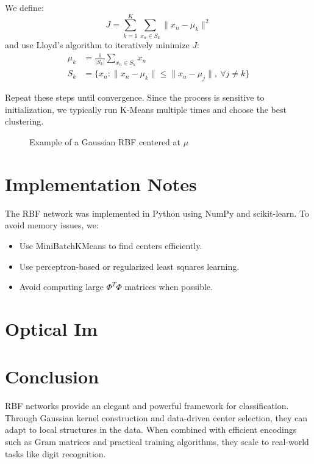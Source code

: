 \documentclass[twocolumn]{article} %
\begin{document}
We define:
\[
J = \sum_{k=1}^K \sum_{x_n \in S_k} \| x_n - \mu_k \|^2
\]
and use Lloyd's algorithm to iteratively minimize $J$:
\begin{align*}
\mu_k &= \frac{1}{|S_k|}\sum_{x_n \in S_k} x_n \\
S_k &= \{ x_n : \|x_n - \mu_k\| \leq \|x_n - \mu_j\|,\ \forall j \neq k \}
\end{align*}

Repeat these steps until convergence. Since the process is sensitive to initialization, we typically run K-Means multiple times and choose the best clustering.

\begin{figure}[h!]
    \centering
    
    \caption{Example of a Gaussian RBF centered at $\mu$}
    \label{fig:gaussian_rbf}
\end{figure} 

\section{Implementation Notes}
The RBF network was implemented in Python using NumPy and scikit-learn. To avoid memory issues, we:
\begin{itemize}
    \item Use MiniBatchKMeans to find centers efficiently.
    \item Use perceptron-based or regularized least squares learning.
    \item Avoid computing large $\Phi^T\Phi$ matrices when possible.
\end{itemize}

\section{Optical Im}

\section{Conclusion}
RBF networks provide an elegant and powerful framework for classification. Through Gaussian kernel construction and data-driven center selection, they can adapt to local structures in the data. When combined with efficient encodings such as Gram matrices and practical training algorithms, they scale to real-world tasks like digit recognition.

{}

\end{document}
